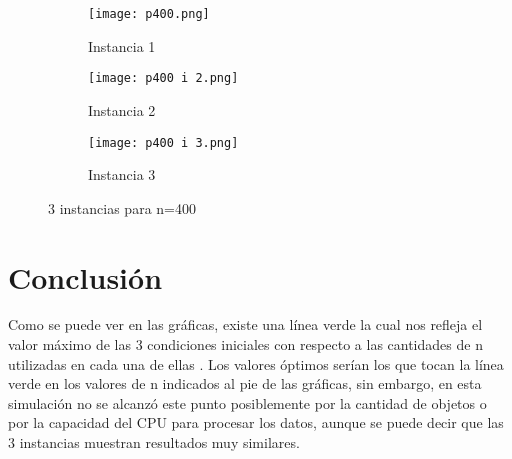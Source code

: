 \documentclass{article}
\begin{document}
\begin{figure}[H]
       \centering
       \begin{subfigure}[b]{0.49\linewidth}
           \texttt{[image: p400.png]}
           \caption{Instancia 1}
           \label{fig:westminster_lateral}
        \end{subfigure}
          \begin{subfigure}[b]{0.49\linewidth}
           \texttt{[image: p400 i 2.png]}
           \caption{Instancia 2}
           \label{fig:westminster_lateral}
        \end{subfigure}
       \begin{subfigure}[b]{0.49\linewidth}
           \texttt{[image: p400 i 3.png]}
           \caption{Instancia 3}
           \label{fig:westminster_lateral}
        \end{subfigure}   
        \caption{3 instancias para n=400}
        \label{fig:westminster}
\end{figure}


\newpage
\section{Conclusi\'on}

Como se puede ver en las gr\'aficas, existe una l\'inea verde la cual nos refleja el valor m\'aximo de las 3 condiciones iniciales con respecto a las cantidades de n utilizadas en cada una de ellas \cite {yo}. Los valores \'optimos ser\'ian los que tocan la l\'inea verde en los valores de n indicados al pie de las gr\'aficas, sin embargo, en esta simulaci\'on no se alcanz\'o este punto posiblemente por la cantidad de objetos o por la capacidad del CPU para procesar los datos, aunque se puede decir que las 3 instancias muestran resultados muy similares.



\end{document}
